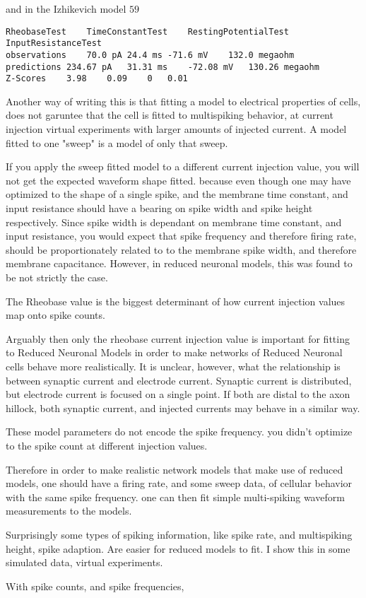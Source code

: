 and in the Izhikevich model $59$

\begin{verbatim}
RheobaseTest	TimeConstantTest	RestingPotentialTest	InputResistanceTest
observations	70.0 pA	24.4 ms	-71.6 mV	132.0 megaohm
predictions	234.67 pA	31.31 ms	-72.08 mV	130.26 megaohm
Z-Scores	3.98	0.09	0	0.01
\end{verbatim}

Another way of writing this is that fitting a model to electrical properties of cells, does not
garuntee that the cell is fitted to multispiking behavior, at current injection virtual experiments with larger amounts of injected current.
A model fitted to one "sweep" is a model of only that sweep. 

If you apply the sweep fitted model to a different current injection value, you will not get the expected waveform shape fitted.
because even though one may have optimized to the shape of a single spike, and the membrane time constant, and input resistance should have a bearing
 on spike width and spike height respectively. Since spike width is dependant on membrane time constant, and input resistance, you 
 would expect that spike frequency and therefore firing rate, should be proportionately related to 
 to the membrane spike width, and therefore membrane capacitance. However, in reduced neuronal models, this was found
 to be not strictly the case.

 The Rheobase value is the biggest determinant of how current injection values map onto spike counts.


 Arguably then only the rheobase current injection value is important for fitting to Reduced Neuronal Models in order to make networks of Reduced Neuronal cells behave more realistically.
 It is unclear, however, what the relationship is between synaptic current and electrode current. Synaptic current is distributed, but electrode current is focused on a single point.
 If both are distal to the axon hillock, both synaptic current, and injected currents may behave in a similar way.


 These model parameters do not encode the spike frequency.
you didn't optimize to the spike count at different injection values.

Therefore in order to make realistic network models that make use of reduced models, 
one should have a firing rate, and some sweep data, of cellular behavior with the same spike frequency.
one can then fit simple multi-spiking waveform measurements to the models.

Surprisingly some types of spiking information, like spike rate, and multispiking height, spike adaption.
Are easier for reduced models to fit. I show this in some simulated data, virtual experiments.

With spike counts, and spike frequencies, 
